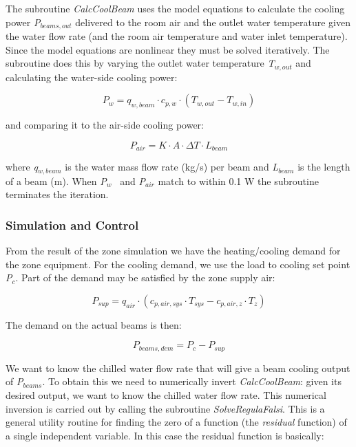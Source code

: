 The subroutine \emph{CalcCoolBeam} uses the model equations to calculate the cooling power \emph{P\(_{beams,out}\)} delivered to the room air and the outlet water temperature given the water flow rate (and the room air temperature and water inlet temperature). Since the model equations are nonlinear they must be solved iteratively. The subroutine does this by varying the outlet water temperature \emph{T\(_{w,out}\)} and calculating the water-side cooling power:

\begin{equation}
P_{w} = q_{w,beam}·c_{p,w}·(T_{w,out}-T_{w,in})
\end{equation}

and comparing it to the air-side cooling power:

\begin{equation}
P_{air} = K·A·\Delta T·L_{beam}
\end{equation}

where \emph{q\(_{w,beam}\)} is the water mass flow rate (kg/s) per beam and \emph{L\(_{beam}\)} is the length of a beam (m). When \emph{P}\(_{w}\) ~and \emph{P\(_{air}\)} match to within 0.1 W the subroutine terminates the iteration.

\subsubsection{Simulation and Control}\label{simulation-and-control-4}

From the result of the zone simulation we have the heating/cooling demand for the zone equipment. For the cooling demand, we use the load to cooling set point \emph{P\(_{c}\)}. Part of the demand may be satisfied by the zone supply air:

\begin{equation}
P_{sup} = q_{air}·(c_{p,air,sys}·T_{sys} - c_{p,air,z}·T_{z})
\end{equation}

The demand on the actual beams is then:

\begin{equation}
P_{beams,dem} = P_{c} - P_{sup}
\end{equation}

We want to know the chilled water flow rate that will give a beam cooling output of \emph{P\(_{beams}\)}. To obtain this we need to numerically invert \emph{CalcCoolBeam}: given its desired output, we want to know the chilled water flow rate. This numerical inversion is carried out by calling the subroutine \emph{SolveRegulaFalsi}. This is a general utility routine for finding the zero of a function (the \emph{residual} function) of a single independent variable. In this case the residual function is basically:

